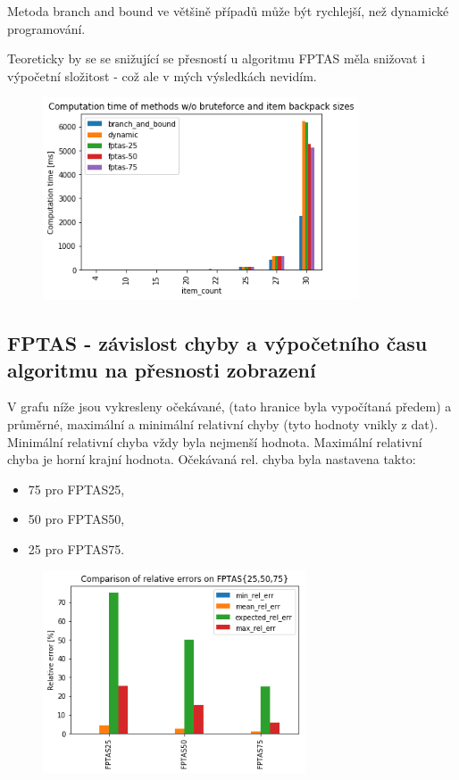 \documentclass[a4paper,10pt,twocolumn]{article}
\begin{document}
Metoda branch and bound ve většině případů může být rychlejší, než dynamické programování. 

Teoreticky by se se snižující se přesností u algoritmu FPTAS měla snižovat i výpočetní složitost - což ale v mých výsledkách nevidím.

\begin{figure}[H]
  \begin{center}
    \includegraphics[height=6cm]{graphs/no_brute_speed_all.png}
  \end{center}
\end{figure}



\subsection{FPTAS - závislost chyby a výpočetního času algoritmu na přesnosti zobrazení}

V grafu níže jsou vykresleny očekávané, (tato hranice byla vypočítaná předem) a průměrné, maximální a minimální relativní chyby (tyto hodnoty vnikly z dat). Minimální relativní chyba vždy byla nejmenší hodnota. Maximální relativní chyba je horní krajní hodnota. Očekávaná rel. chyba byla nastavena takto:

 \begin{itemize}
\item 75 pro FPTAS25,
\item 50 pro FPTAS50,
\item 25 pro FPTAS75.
 \end{itemize}


\begin{figure}[H]
  \begin{center}
    \includegraphics[height=6cm]{graphs/fptas_err_all.png}
  \end{center}
\end{figure}
\end{document}
